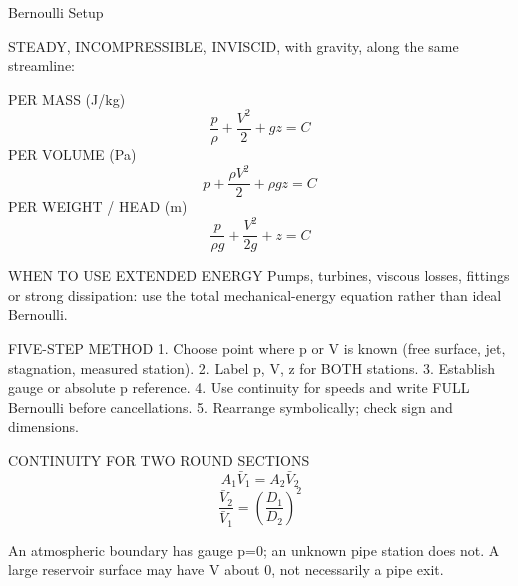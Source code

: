 Bernoulli Setup

STEADY, INCOMPRESSIBLE, INVISCID, with gravity, along the same streamline:

PER MASS (J/kg)
$$\frac{p}{\rho}+\frac{V^2}{2}+gz=C$$
PER VOLUME (Pa)
$$p+\frac{\rho V^2}{2}+\rho gz=C$$
PER WEIGHT / HEAD (m)
$$\frac{p}{\rho g}+\frac{V^2}{2g}+z=C$$

WHEN TO USE EXTENDED ENERGY
Pumps, turbines, viscous losses, fittings or strong dissipation: use the total mechanical-energy equation rather than ideal Bernoulli.

FIVE-STEP METHOD
1. Choose point where p or V is known (free surface, jet, stagnation, measured station).
2. Label p, V, z for BOTH stations.
3. Establish gauge or absolute p reference.
4. Use continuity for speeds and write FULL Bernoulli before cancellations.
5. Rearrange symbolically; check sign and dimensions.

CONTINUITY FOR TWO ROUND SECTIONS
$$A_1\bar V_1=A_2\bar V_2$$
$$\frac{\bar V_2}{\bar V_1}=(\frac{D_1}{D_2})^2$$

An atmospheric boundary has gauge p=0; an unknown pipe station does not.
A large reservoir surface may have V about 0, not necessarily a pipe exit.
